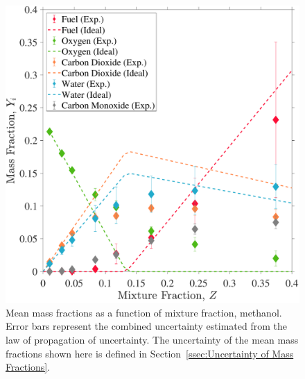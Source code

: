 \documentclass[12pt]{article}
\begin{document}
\begin{figure}[!]
	\centering
\includegraphics[width=\textwidth,keepaspectratio]{Adjusted_FuelMethanol_Mixture_Fraction_Intermediate_Plot.pdf}
	\caption[Mean mass fractions as a function of mixture fraction, methanol]{Mean mass fractions as a function of mixture fraction, methanol. Error bars represent the combined uncertainty estimated from the law of propagation of uncertainty. The uncertainty of the mean mass fractions shown here is defined in Section~\ref{ssec:Uncertainty of Mass Fractions}.}
	\label{fig:Methanol_Mix_Frac}
\end{figure}
\end{document}
